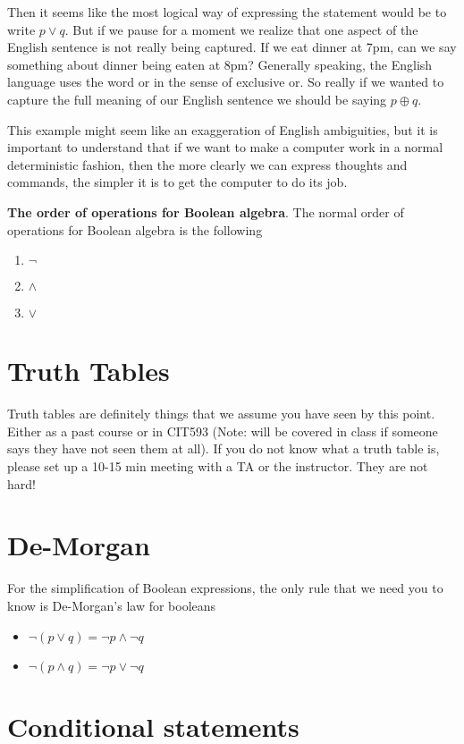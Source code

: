\documentclass[12pt]{article}
\begin{document}
Then it seems like the most logical way of expressing the statement would be to write $p \vee q$. But if we pause for a moment we realize that one aspect of the English sentence is not really being captured. If we eat dinner at 7pm, can we say something about dinner being eaten at 8pm? Generally speaking, the English language uses the word or in the sense of exclusive or. So really if we wanted to capture the full meaning of our English sentence we should be saying $p \oplus q$.

This example might seem like an exaggeration of English ambiguities, but it is important to understand that if we want to make a computer work in a normal deterministic fashion, then the more clearly we can express thoughts and commands, the simpler it is to get the computer to do its job. 

\textbf{The order of operations for Boolean algebra}. The normal order of operations for Boolean algebra is the following

\begin{enumerate}
\item $\neg$
\item $\wedge$
\item $\vee$
\end{enumerate}

\section*{Truth Tables}

Truth tables are definitely things that we assume you have seen by this point. Either as a past course or in CIT593 (Note: will be covered in class if someone says they have not seen them at all). If you do not know what a truth table is, please set up a 10-15 min meeting with a TA or the instructor. They are not hard!


\section*{De-Morgan}
For the simplification of Boolean expressions, the only rule that we need you to know is De-Morgan's law for booleans

\begin{itemize}
\item $\neg(p \vee q) = \neg p \wedge \neg q$
\item $\neg(p \wedge q) = \neg p \vee \neg q$
\end{itemize}

\section*{Conditional statements}
\end{document}
